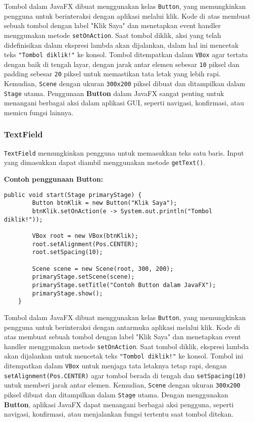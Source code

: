 Tombol dalam JavaFX dibuat menggunakan kelas \texttt{Button}, yang memungkinkan pengguna untuk berinteraksi dengan aplikasi melalui klik. Kode di atas membuat sebuah tombol dengan label "Klik Saya" dan menetapkan event handler menggunakan metode \texttt{setOnAction}. Saat tombol diklik, aksi yang telah didefinisikan dalam ekspresi lambda akan dijalankan, dalam hal ini mencetak teks \texttt{"Tombol diklik!"} ke konsol. Tombol ditempatkan dalam \texttt{VBox} agar tertata dengan baik di tengah layar, dengan jarak antar elemen sebesar \texttt{10} piksel dan padding sebesar \texttt{20} piksel untuk memastikan tata letak yang lebih rapi. Kemudian, \texttt{Scene} dengan ukuran \texttt{300x200} piksel dibuat dan ditampilkan dalam \texttt{Stage} utama. Penggunaan \textbf{Button} dalam JavaFX sangat penting untuk menangani berbagai aksi dalam aplikasi GUI, seperti navigasi, konfirmasi, atau memicu fungsi lainnya.

\subsubsection{TextField}

\texttt{TextField} memungkinkan pengguna untuk memasukkan teks satu baris. Input yang dimasukkan dapat diambil menggunakan metode \texttt{getText()}.

\textbf{Contoh penggunaan Button:}
\begin{lstlisting}[style=JavaStyle, caption=Membuat Button dan Menangani Event]
	public void start(Stage primaryStage) {
		Button btnKlik = new Button("Klik Saya");
		btnKlik.setOnAction(e -> System.out.println("Tombol diklik!"));
		
		VBox root = new VBox(btnKlik);
		root.setAlignment(Pos.CENTER);
		root.setSpacing(10);
		
		Scene scene = new Scene(root, 300, 200);
		primaryStage.setScene(scene);
		primaryStage.setTitle("Contoh Button dalam JavaFX");
		primaryStage.show();
	}
\end{lstlisting}

Tombol dalam JavaFX dibuat menggunakan kelas \texttt{Button}, yang memungkinkan pengguna untuk berinteraksi dengan antarmuka aplikasi melalui klik. Kode di atas membuat sebuah tombol dengan label "Klik Saya" dan menetapkan event handler menggunakan metode \texttt{setOnAction}. Saat tombol diklik, ekspresi lambda akan dijalankan untuk mencetak teks \texttt{"Tombol diklik!"} ke konsol. Tombol ini ditempatkan dalam \texttt{VBox} untuk menjaga tata letaknya tetap rapi, dengan \texttt{setAlignment(Pos.CENTER)} agar tombol berada di tengah dan \texttt{setSpacing(10)} untuk memberi jarak antar elemen. Kemudian, \texttt{Scene} dengan ukuran \texttt{300x200} piksel dibuat dan ditampilkan dalam \texttt{Stage} utama. Dengan menggunakan \textbf{Button}, aplikasi JavaFX dapat menangani berbagai aksi pengguna, seperti navigasi, konfirmasi, atau menjalankan fungsi tertentu saat tombol ditekan.

